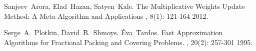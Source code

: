 \documentclass[11pt]{article}
\begin{document}


\begin{thebibliography}{42}

Sanjeev~Arora, Elad~Hazan, Satyen~Kale.
\newblock The Multiplicative Weights Update Method: A Meta-Algorithm and Applications
, 8(1): 121-164 2012.


Serge~A.~Plotkin, David~B.~Shmoys, \'{E}va~Tardos.
\newblock Fast Approximation Algorithms for Fractional Packing and Covering Problems. 
, 20(2): 257-301 1995.

\end{thebibliography}
\end{document}
